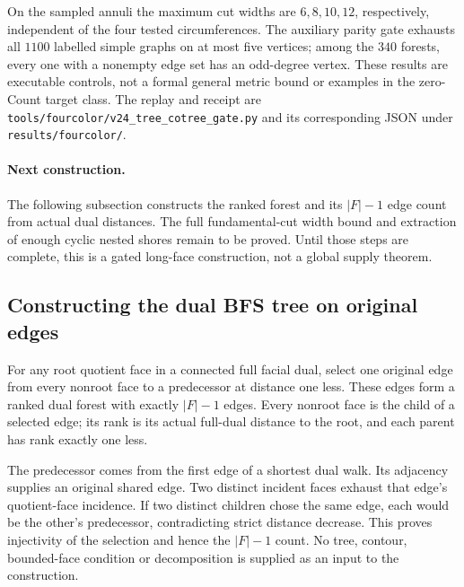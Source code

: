 On the sampled annuli the maximum cut widths are $6,8,10,12$, respectively,
independent of the four tested circumferences.  The auxiliary parity gate
exhausts all $1100$ labelled simple graphs on at most five vertices;
among the $340$ forests, every one with a nonempty edge set has an odd-degree vertex.
These results are executable controls, not a formal general metric bound
or examples in the zero-Count target class.  The replay and receipt are
\texttt{tools/fourcolor/v24\_tree\_cotree\_gate.py} and its corresponding
JSON under \texttt{results/fourcolor/}.

\paragraph{Next construction.}
The following subsection constructs the ranked forest and its $|F|-1$
edge count from actual dual distances.  The full fundamental-cut width
bound and extraction of enough cyclic nested shores remain to be proved.
Until those steps are complete, this is a gated long-face construction,
not a global supply theorem.
\subsection{Constructing the dual BFS tree on original edges}
\label{sec:dual-bfs-tree}

\begin{theorem}
For any root quotient face in a connected full facial dual, select one
original edge from every nonroot face to a predecessor at distance one
less.  These edges form a ranked dual forest with exactly $|F|-1$ edges.
Every nonroot face is the child of a selected edge; its rank is its
actual full-dual distance to the root, and each parent has rank exactly
one less.
\end{theorem}

The predecessor comes from the first edge of a shortest dual walk.
Its adjacency supplies an original shared edge.  Two distinct incident
faces exhaust that edge's quotient-face incidence.  If two distinct
children chose the same edge, each would be the other's predecessor,
contradicting strict distance decrease.  This proves injectivity of the
selection and hence the $|F|-1$ count.  No tree, contour, bounded-face
condition or decomposition is supplied as an input to the construction.

